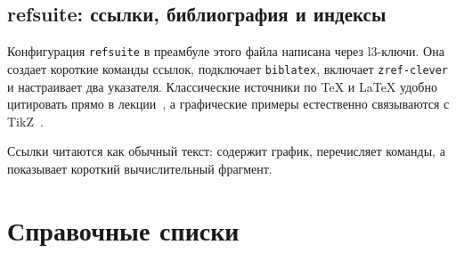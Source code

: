 \documentclass{lecturenotes}
\begin{document}
\section{refsuite: ссылки, библиография и индексы}
\label{sec:references}

Конфигурация \texttt{refsuite} в преамбуле этого файла написана через l3-ключи.
Она создает короткие команды ссылок, подключает \texttt{biblatex}, включает
\texttt{zref-clever} и настраивает два указателя. Классические источники по
\TeX{} и \LaTeX{} удобно цитировать прямо в лекции~\cite{knuth1984texbook,lamport1994latex},
а графические примеры естественно связываются с TikZ~\cite{tantau2013tikz,ctanpgf}.

Ссылки читаются как обычный текст:  содержит график,
 перечисляет команды, а  показывает
короткий вычислительный фрагмент.

\clearpage
\chapter*{Справочные списки}

\listofkeytheorems[title={Список теорем}]

\printbibliographymain
\printbibliographyonline

\printindexnotation
\printindex
\end{document}
